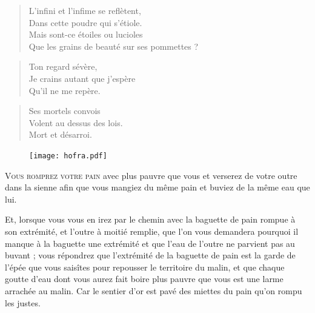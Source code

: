 \begin{verse}
  L’infini et l’infime se reflètent,\\  %
  Dans cette poudre qui s’étiole.\\  %
  Mais sont-ce étoiles ou lucioles\\  %
  Que les grains de beauté sur ses pommettes ?
\end{verse}

\begin{verse}\haiku
  Ton regard sévère,\\  %
  Je crains autant que j’espère\\  %
  Qu’il ne me repère.
\end{verse}


\begin{verse}\haiku
  Ses mortels convois\\
  Volent au dessus des lois.\\
  Mort et désarroi.
\end{verse}

\begin{figure}[h]
  \centering
  \texttt{[image: hofra.pdf]}
  \captionsetup{labelformat=empty}
  \caption[Idéotexte du  (\textarabic{حفره})]{}
\end{figure}

\lettrine[lines=3,slope=-.7em]{V}{ous romprez votre pain} avec plus pauvre que vous et verserez de votre outre dans la sienne afin que vous mangiez du même pain et buviez de la même eau que lui.

Et, lorsque vous vous en irez par le chemin avec la baguette de pain rompue à son extrémité, et l’outre à moitié remplie, que l’on vous demandera pourquoi il manque à la baguette une extrémité et que l’eau de l’outre ne parvient pas au buvant ; vous répondrez que l’extrémité de la baguette de pain est la garde de l’épée que vous saisîtes pour repousser le territoire du malin, et que chaque goutte d’eau dont vous aurez fait boire plus pauvre que vous est une larme arrachée au malin.
Car le sentier d’or est pavé des miettes du pain qu’on rompu les justes.

